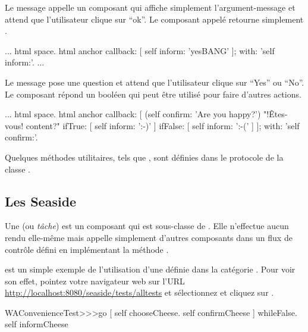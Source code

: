 \documentclass[a4paper,10pt,twoside]{book}
\begin{document}
Le message  appelle un composant qui
affiche simplement l'argument-message et attend que l'utilisateur
clique sur ``ok''.
Le composant appelé retourne simplement .

\begin{code}{}
...
	html space.
	html anchor
		callback: [ self inform: 'yesBANG' ];
		with: 'self inform:'.
...
\end{code}

Le message  pose une question et attend
que l'utilisateur clique sur ``Yes'' ou ``No''.
Le composant répond un booléen qui peut être utilisé pour faire
d'autres actions.

\begin{code}{}
...
	html space.
	html anchor
		callback: [
			(self confirm: 'Are you happy?') "!Êtes-vous! content?"
				ifTrue: [ self inform: ':-)' ]
				ifFalse: [ self inform: ':-(' ]
			];
		with: 'self confirm:'.
\end{code}

Quelques méthodes utilitaires, tels que
, sont définies dans le
protocole  de la classe .

\subsection{Les \tasks Seaside}

Une  (ou \emph{tâche}) est un composant qui est
sous-classe de .
Elle n'effectue aucun rendu elle-même mais appelle simplement
d'autres composants dans un flux de contrôle défini en implémentant la
méthode .


 est un simple exemple de l'utilisation
d'une \task définie dans la catégorie
  . %
Pour voir son effet, pointez votre navigateur web sur l'URL
\url{http://localhost:8080/seaside/tests/alltests} et sélectionnez
 et cliquez sur .

\begin{code}{}
WAConvenienceTest>>>go
	[ self chooseCheese.
	  self confirmCheese ] whileFalse.
	self informCheese
\end{code}
\end{document}
